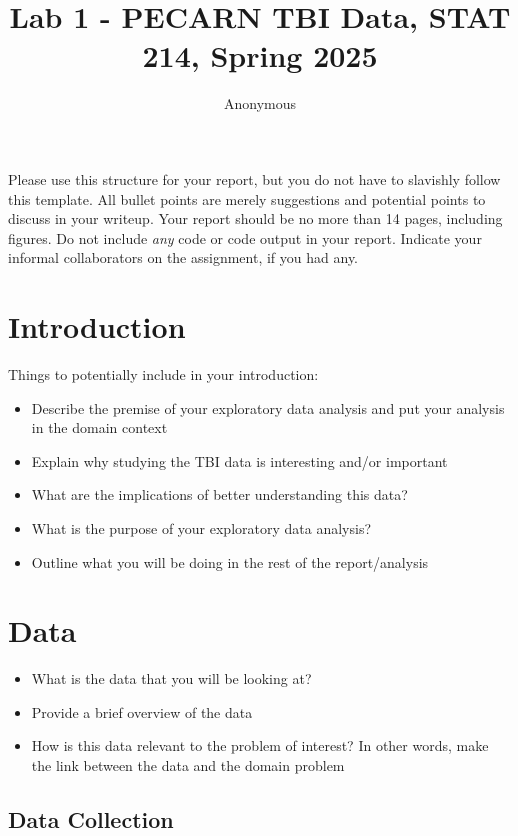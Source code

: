 \documentclass[10pt,letterpaper]{article}
\title{Lab 1 - PECARN TBI Data, STAT 214, Spring 2025}
\author{Anonymous}
\begin{document}
\maketitle

Please use this structure for your report, but you do not have to
slavishly follow this template. All bullet points are merely suggestions
and potential points to discuss in your writeup. Your report should be
no more than 14 pages, including figures. Do not include \emph{any} code
or code output in your report. Indicate your informal collaborators on
the assignment, if you had any.

\section{Introduction}\label{introduction}

Things to potentially include in your introduction:

\begin{itemize}
\item Describe the premise of your exploratory data analysis and put your analysis in the domain context
\item Explain why studying the TBI data is interesting and/or important
\item What are the implications of better understanding this data?
\item What is the purpose of your exploratory data analysis?
\item Outline what you will be doing in the rest of the report/analysis
\end{itemize}


\section{Data}\label{data}

\begin{itemize}
\item What is the data that you will be looking at?
\item Provide a brief overview of the data
\item How is this data relevant to the problem of interest? In other words, make the link between the data and the domain problem
\end{itemize}

\subsection{Data Collection}\label{data-collection}
\end{document}
